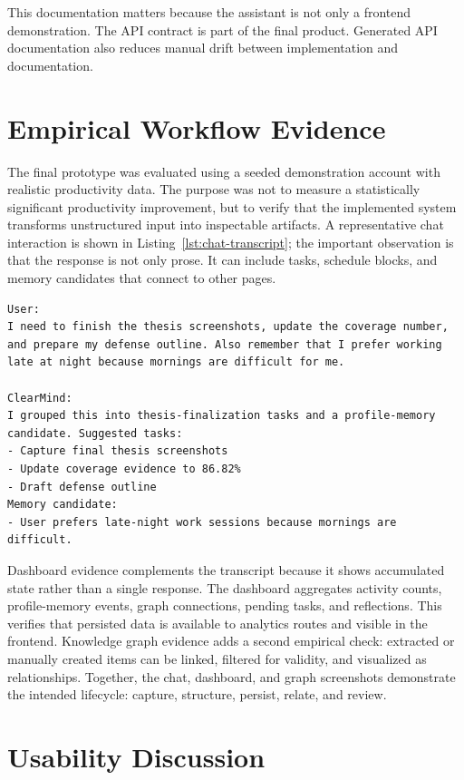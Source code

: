 This documentation matters because the assistant is not only a frontend demonstration. The API contract is part of the final product. Generated API documentation also reduces manual drift between implementation and documentation.

\section{Empirical Workflow Evidence}

The final prototype was evaluated using a seeded demonstration account with realistic productivity data. The purpose was not to measure a statistically significant productivity improvement, but to verify that the implemented system transforms unstructured input into inspectable artifacts. A representative chat interaction is shown in Listing~\ref{lst:chat-transcript}; the important observation is that the response is not only prose. It can include tasks, schedule blocks, and memory candidates that connect to other pages.

\begin{lstlisting}[caption={Representative ClearMind chat transcript},label={lst:chat-transcript}]
User:
I need to finish the thesis screenshots, update the coverage number,
and prepare my defense outline. Also remember that I prefer working
late at night because mornings are difficult for me.

ClearMind:
I grouped this into thesis-finalization tasks and a profile-memory
candidate. Suggested tasks:
- Capture final thesis screenshots
- Update coverage evidence to 86.82%
- Draft defense outline
Memory candidate:
- User prefers late-night work sessions because mornings are difficult.
\end{lstlisting}

Dashboard evidence complements the transcript because it shows accumulated state rather than a single response. The dashboard aggregates activity counts, profile-memory events, graph connections, pending tasks, and reflections. This verifies that persisted data is available to analytics routes and visible in the frontend. Knowledge graph evidence adds a second empirical check: extracted or manually created items can be linked, filtered for validity, and visualized as relationships. Together, the chat, dashboard, and graph screenshots demonstrate the intended lifecycle: capture, structure, persist, relate, and review.

\section{Usability Discussion}

